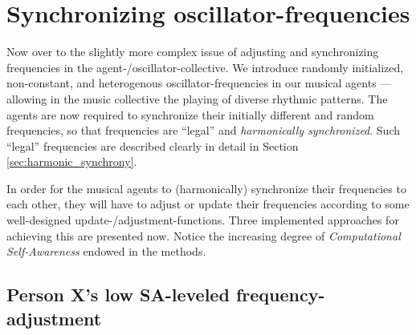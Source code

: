 	
	
	
	
	
	










	

\section{Synchronizing oscillator-frequencies}
\label{sec:frequency_methods}

	Now over to the slightly more complex issue of adjusting and synchronizing frequencies in the agent-/oscillator-collective. We introduce randomly initialized, non-constant, and heterogenous oscillator-frequencies in our musical agents — allowing in the music collective the playing of diverse rhythmic patterns. The agents are now required to synchronize their initially different and random frequencies, so that frequencies are ``legal'' and \textit{harmonically synchronized}. Such ``legal'' frequencies are described clearly in detail in Section \ref{sec:harmonic_synchrony}.
	
	In order for the musical agents to (harmonically) synchronize their frequencies to each other, they will have to adjust or update their frequencies according to some well-designed update-/adjustment-functions. Three implemented approaches for achieving this are presented now. Notice the increasing degree of \textit{Computational Self-Awareness} endowed in the methods.
	
	
	
	
	\subsection{Person X's low SA-leveled frequency-adjustment}
	
	
